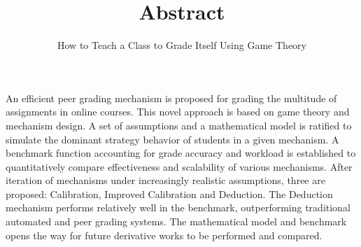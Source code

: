 \documentclass[12pt, Arial]{article}
\title{Abstract}
\author{How to Teach a Class to Grade Itself Using Game Theory}
\date{}
\begin{document}
\maketitle
An efficient peer grading mechanism is proposed for grading the multitude of assignments in online courses. This novel approach is based on game theory and mechanism design. A set of assumptions and a mathematical model is ratified to simulate the dominant strategy behavior of students in a given mechanism. A benchmark function accounting for grade accuracy and workload is established to quantitatively compare effectiveness and scalability of various mechanisms. After iteration of mechanisms under increasingly realistic assumptions, three are proposed: Calibration, Improved Calibration and Deduction. The Deduction mechanism performs relatively well in the benchmark, outperforming traditional automated and peer grading systems. The mathematical model and benchmark opens the way for future derivative works to be performed and compared.
\end{document}
